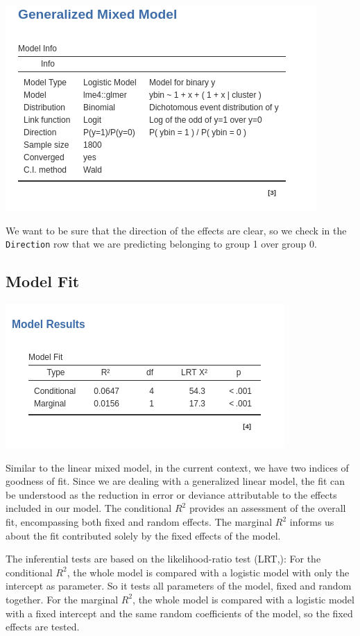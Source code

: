 \documentclass[
]{book}
\begin{document}
\includegraphics[width=0.8\linewidth]{bookletpics/5_logistic_output1}

We want to be sure that the direction of the effects are clear, so we check in the \texttt{Direction} row that we are predicting belonging to group 1 over group 0.

\hypertarget{model-fit-3}{%
\subsection{Model Fit}\label{model-fit-3}}

\includegraphics[width=0.6\linewidth]{bookletpics/5_logistic_output2}

Similar to the linear mixed model, in the current context, we have two indices of goodness of fit. Since we are dealing with a generalized linear model, the fit can be understood as the reduction in error or deviance attributable to the effects included in our model. The conditional \(R^2\) provides an assessment of the overall fit, encompassing both fixed and random effects. The marginal \(R^2\) informs us about the fit contributed solely by the fixed effects of the model.

The inferential tests are based on the likelihood-ratio test (LRT,): For the conditional \(R^2\), the whole model is compared with a logistic model with only the intercept as parameter. So it tests all parameters of the model, fixed and random together. For the marginal \(R^2\), the whole model is compared with a logistic model with a fixed intercept and the same random coefficients of the model, so the fixed effects are tested.
\end{document}
